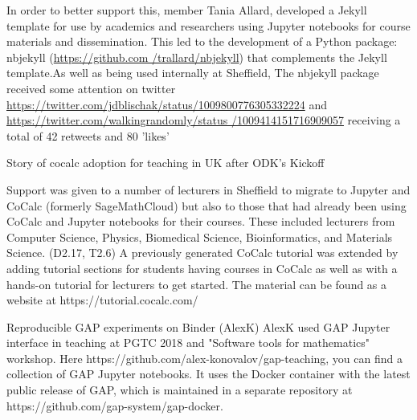 \begin{Aim 1}
In order to better support this, \ODK member Tania Allard, developed a Jekyll template for use by academics and researchers using Jupyter 
notebooks for course materials and dissemination. This led to the development of a Python package: nbjekyll (\url{https://github.com
/trallard/nbjekyll}) that complements the Jekyll template.As well as being used internally at Sheffield, The nbjekyll package received some 
attention on twitter \url{https://twitter.com/jdblischak/status/1009800776305332224} and \url{https://twitter.com/walkingrandomly/status
/1009414151716909057} receiving a total of 42 retweets and 80 'likes'%


Story of cocalc adoption for teaching in UK after ODK's Kickoff
            
Support was given to a number of lecturers in Sheffield to migrate to Jupyter and CoCalc (formerly SageMathCloud) but also to those that had 
already been using CoCalc and Jupyter notebooks for their courses. These included lecturers from Computer Science, Physics, Biomedical 
Science, Bioinformatics, and Materials Science. (D2.17, T2.6) A previously generated CoCalc tutorial was extended by adding tutorial 
sections for students having courses in CoCalc as well as with a hands-on tutorial for lecturers to get started. The material can be found 
as a website at https://tutorial.cocalc.com/ 



Reproducible GAP experiments on Binder (AlexK)
AlexK %
used GAP Jupyter interface in teaching at PGTC 2018 and "Software tools for mathematics" workshop.
Here https://github.com/alex-konovalov/gap-teaching, you can find a collection of GAP Jupyter notebooks. It uses the Docker container with the latest public release of GAP, which is maintained in a separate repository at https://github.com/gap-system/gap-docker.


\end{Aim 1}
